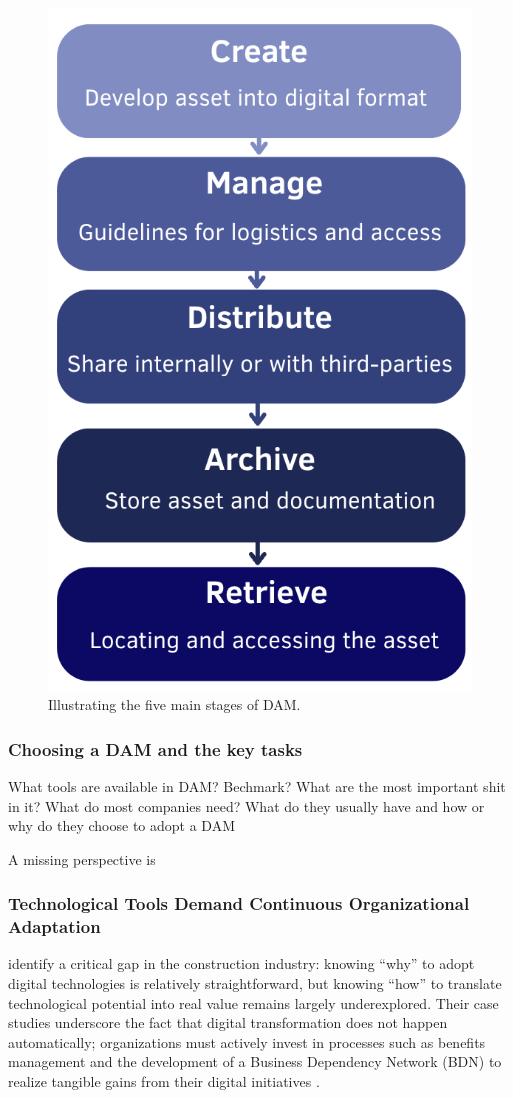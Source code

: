 \documentclass[a4paper,10pt,twocolumn]{article}
\numberwithin{figure}{section}
\numberwithin{table}{section}
\begin{document}
\begin{figure}[htbp]
    \centering
    \includegraphics[width=0.5\linewidth]{4steg.png}  %
    \caption{Illustrating the five main stages of DAM.}
    \label{fig:4steg}  
\end{figure}

\vspace{0.3cm}
\subsubsection{Choosing a DAM and the key tasks}
\vspace{0.3cm}
What tools are available in DAM? 
Bechmark? 
What are the most important shit in it?
What do most companies need? 
What do they usually have and how or 
why do they choose to adopt a DAM

A missing perspective is 

\vspace{0.3cm}
\subsubsection{Technological Tools Demand Continuous Organizational Adaptation}
\vspace{0.3cm}

\cite{LOVE2019102930} identify a critical gap in the construction industry: knowing “why” 
to adopt digital technologies is relatively straightforward, but knowing “how” to translate 
technological potential into real value remains largely underexplored. Their case studies underscore 
the fact that digital transformation does not happen automatically; organizations must actively
 invest in processes such as benefits management and the development of a Business Dependency 
 Network (BDN) to realize tangible gains from their digital initiatives \citep{LOVE2019102930}.
\end{document}
